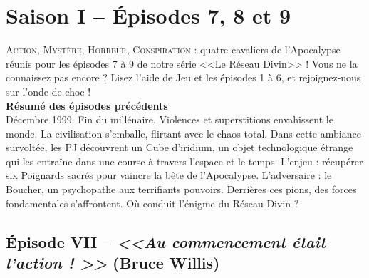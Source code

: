 \documentclass[11pt,twoside,a4paper]{book}
\begin{document}
\clearpage

\chapter*{Saison I -- {\'E}pisodes 7, 8 et 9}

\lettrine{A}{ction, Myst{\`e}re, Horreur, Conspiration} : quatre cavaliers de l'Apocalypse r{\'e}unis pour les {\'e}pisodes 7 {\`a} 9 de notre s{\'e}rie <<Le R{\'e}seau Divin>> ! Vous ne la connaissez pas encore ? Lisez l'aide de Jeu et les {\'e}pisodes 1 {\`a} 6, et rejoignez-nous sur l'onde de choc !~\\

\textbf{\large R{\'e}sum{\'e} des {\'e}pisodes pr{\'e}c{\'e}dents}~\\

D{\'e}cembre 1999. Fin du mill{\'e}naire. Violences et superstitions envahissent le monde. La civilisation s'emballe, flirtant avec le chaos total. Dans cette ambiance survolt{\'e}e, les PJ d{\'e}couvrent un Cube d'iridium, un objet technologique {\'e}trange qui les entra{\^i}ne dans une course {\`a} travers l'espace et le temps. L'enjeu : r{\'e}cup{\'e}rer six Poignards sacr{\'e}s pour vaincre la b{\^e}te de l'Apocalypse. L'adversaire : le Boucher, un psychopathe aux terrifiants pouvoirs. Derri{\`e}res ces pions, des forces fondamentales s'affrontent. O{\`u} conduit l'{\'e}nigme du R{\'e}seau Divin ?~\\

\section*{{\'E}pisode VII -- \emph{<<\textbf{Au commencement {\'e}tait l'action ! }>>} (Bruce Willis)}

\end{document}

